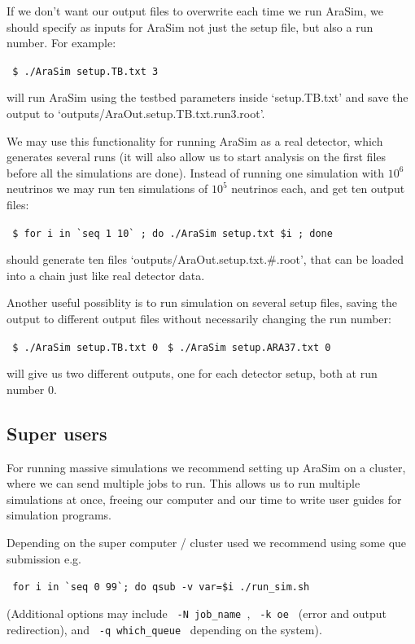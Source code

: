 \documentclass[a4paper,10pt]{article}
\newcommand{\room}{\vspace{0.3cm}}
\newcommand{\arasim}{AraSim\xspace}
\begin{document}
\room

If we don't want our output files to overwrite each time we run \arasim, we should specify as inputs for \arasim not just the setup file, but also a run number. For example:

\verb| $ ./AraSim setup.TB.txt 3 | 

will run \arasim using the testbed parameters inside `setup.TB.txt' and save the output to `outputs/AraOut.setup.TB.txt.run3.root'. 

We may use this functionality for running \arasim as a real detector, which generates several runs (it will also allow us to start analysis on the first files before all the simulations are done). Instead of running one simulation with $10^6$ neutrinos we may run ten simulations of $10^5$ neutrinos each, and get ten output files:

\verb| $ for i in `seq 1 10` ; do ./AraSim setup.txt $i ; done |

should generate ten files `outputs/AraOut.setup.txt.\#.root', that can be loaded into a chain just like real detector data. 

\room

Another useful possiblity is to run simulation on several setup files, saving the output to different output files without necessarily changing the run number:

\verb| $ ./AraSim setup.TB.txt 0|
\verb| $ ./AraSim setup.ARA37.txt 0|

will give us two different outputs, one for each detector setup, both at run number 0. 

\subsection{Super users}\label{super users}

For running massive simulations we recommend setting up \arasim on a cluster, where we can send multiple jobs to run. This allows us to run multiple simulations at once, freeing our computer and our time to write user guides for simulation programs. 

Depending on the super computer / cluster used we recommend using some que submission e.g.

\verb| for i in `seq 0 99`; do qsub -v var=$i ./run_sim.sh | 

(Additional options may include \verb| -N job_name |, \verb| -k oe | (error and output redirection), and \verb| -q which_queue |  depending on the system). 
\end{document}
